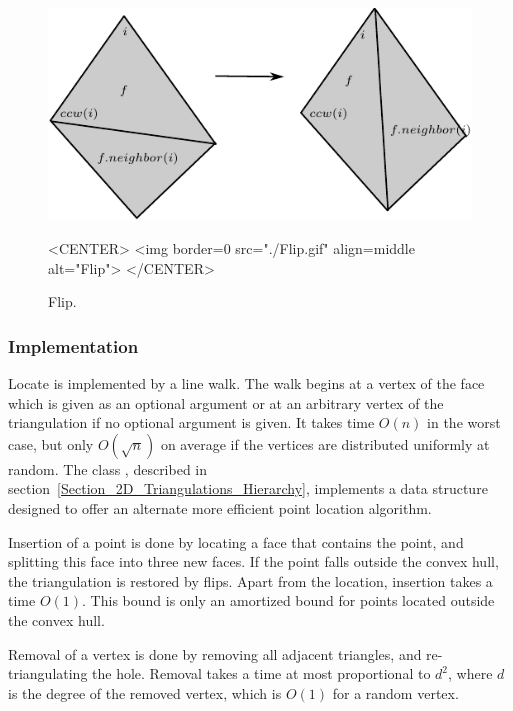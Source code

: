 \begin{figure}
\begin{ccTexOnly}
\begin{center}
\includegraphics{Triangulation_2/flip}
\end{center}
\end{ccTexOnly} 
\begin{ccHtmlOnly}
<CENTER>
<img border=0 src="./Flip.gif" align=middle alt="Flip">
</CENTER>
\end{ccHtmlOnly} 

\caption{Flip. \label{2D_Triangulation_fig_flip_bis}}
\end{figure}


\subsubsection{Implementation}

Locate is implemented by a line walk. The walk
begins  at  a vertex of the face which
is given
as an optional argument  or at an arbitrary vertex of the triangulation
 if no optional argument is given. It takes
time $O(n)$ in the worst case, but only $O(\sqrt{n})$
on average if the vertices are distributed uniformly at random.
The class ,
described in section~\ref{Section_2D_Triangulations_Hierarchy}, 
implements a data structure  designed to
offer an alternate  more efficient point location algorithm.

Insertion of a point is done by locating a face that contains the
point, and splitting this face into three new faces.
If the point falls outside the convex hull, the triangulation
 is restored by flips.  Apart from the location, insertion takes a
time $O(1)$. This bound is only an amortized bound
for points located outside the convex hull.

Removal of a vertex is done by removing all adjacent triangles, and
re-triangulating the hole. Removal takes a time  at most proportional to
$d^2$, where
$d$ is the degree of the removed vertex,
which is $O(1)$ for a random vertex.

